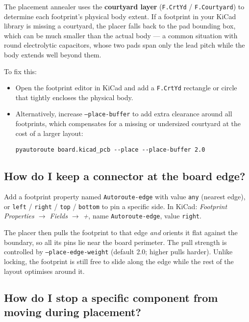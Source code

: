 \documentclass[11pt,a4paper]{article}
\begin{document}
The placement annealer uses the \textbf{courtyard layer}
(\texttt{F.CrtYd} / \texttt{F.Courtyard}) to determine each
footprint's physical body extent. If a footprint in your KiCad library
is missing a courtyard, the placer falls back to the pad bounding box,
which can be much smaller than the actual body --- a common situation
with round electrolytic capacitors, whose two pads span only the lead
pitch while the body extends well beyond them.

To fix this:
\begin{itemize}
    \item Open the footprint editor in KiCad and add a
          \texttt{F.CrtYd} rectangle or circle that tightly encloses the
          physical body.
    \item Alternatively, increase \texttt{--place-buffer} to add extra
          clearance around all footprints, which compensates for a
          missing or undersized courtyard at the cost of a larger layout:
\begin{lstlisting}
pyautoroute board.kicad_pcb --place --place-buffer 2.0
\end{lstlisting}
\end{itemize}

\subsection*{How do I keep a connector at the board edge?}

Add a footprint property named \texttt{Autoroute-edge} with value
\texttt{any} (nearest edge), or \texttt{left} / \texttt{right} /
\texttt{top} / \texttt{bottom} to pin a specific side. In KiCad:
\emph{Footprint Properties $\to$ Fields $\to$ +}, name
\texttt{Autoroute-edge}, value \texttt{right}.

The placer then pulls the footprint to that edge \emph{and} orients it
flat against the boundary, so all its pins lie near the board perimeter.
The pull strength is controlled by \texttt{--place-edge-weight} (default
2.0; higher pulls harder). Unlike locking, the footprint is still free
to slide along the edge while the rest of the layout optimises around it.

\subsection*{How do I stop a specific component from moving during placement?}
\end{document}
